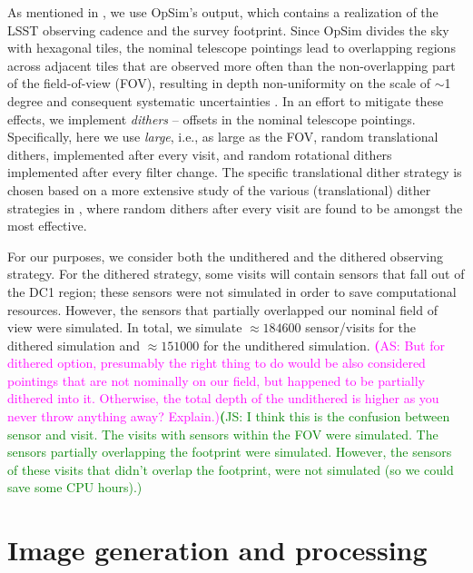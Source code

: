 \documentclass[twocolumn]{aastex62}
\newcommand{\as}[1]{{\textcolor{magenta}{{\textbf (AS: #1)}}}}
\newcommand{\js}[1]{{\textcolor{green}{{\textbf (JS: #1)}}}}
\begin{document}
As mentioned in , we use OpSim's output, which contains a realization of the LSST observing cadence and the survey footprint. Since OpSim divides the sky with hexagonal tiles, the nominal telescope pointings lead to overlapping regions across adjacent tiles that are observed more often than the non-overlapping part of the field-of-view (FOV), resulting in depth non-uniformity on the scale of $\sim$1 degree and consequent systematic uncertainties \citep{2016ApJ...829...50A}. In an effort to mitigate these effects, we implement \textit{dithers} -- offsets in the nominal telescope pointings. Specifically, here we use \textit{large}, i.e., as large as the FOV, random translational dithers, implemented after every visit, and random rotational dithers implemented after every filter change. The specific translational dither strategy is chosen based on a more extensive study of the various (translational) dither strategies in \citet{2016ApJ...829...50A}, where random dithers after every visit are found to be amongst the most effective.

For our purposes, we consider both the undithered and the dithered observing strategy. For the dithered strategy, some visits will contain sensors that fall out of the DC1 region; these sensors were not simulated in order to save computational resources. However, the sensors that partially overlapped our nominal field of view were simulated. In total, we simulate $\approx 184600$ sensor/visits for the dithered simulation and $\approx 151000$ for the undithered simulation.
\as{But for dithered option, presumably the right thing to do would be also considered pointings that are not nominally on our field, but happened to be partially dithered into it. Otherwise, the total depth of the undithered is higher as you never throw anything away? Explain.}\js{I think this is the confusion between sensor and visit. The visits with sensors within the FOV were simulated. The sensors partially overlapping the footprint were simulated. However, the sensors of these visits that didn't overlap the footprint, were not simulated (so we could save some CPU hours).}



\section{Image generation and processing}
\label{sec:image_generation_pipeline}
\end{document}
